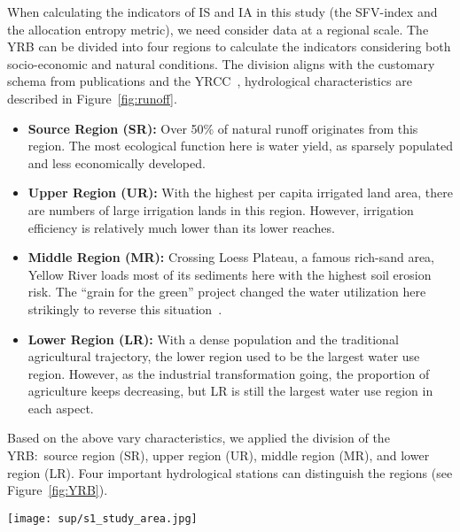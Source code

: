 When calculating the indicators of IS and IA in this study (the SFV-index and the allocation entropy metric), we need consider data at a regional scale.
The YRB can be divided into four regions to calculate the indicators considering both socio-economic and natural conditions.
The division aligns with the customary schema from publications and the YRCC~\cite{yellowriverwaterconservancycommission2010,wang2019c}, hydrological characteristics are described in Figure~\ref{fig:runoff}.

\begin{itemize}
    \item \textbf{Source Region (SR):} Over 50\% of natural runoff originates from this region. The most ecological function here is water yield, as sparsely populated and less economically developed.
    \item \textbf{Upper Region (UR):} With the highest per capita irrigated land area, there are numbers of large irrigation lands in this region. However, irrigation efficiency is relatively much lower than its lower reaches.
    \item \textbf{Middle Region (MR):} Crossing Loess Plateau, a famous rich-sand area, Yellow River loads most of its sediments here with the highest soil erosion risk. The ``grain for the green'' project changed the water utilization here strikingly to reverse this situation~\cite{wu2020a}.
    \item \textbf{Lower Region (LR):} With a dense population and the traditional agricultural trajectory, the lower region used to be the largest water use region. However, as the industrial transformation going, the proportion of agriculture keeps decreasing, but LR is still the largest water use region in each aspect.
\end{itemize}

Based on the above vary characteristics, we applied the division of the YRB:\ source region (SR), upper region (UR), middle region (MR), and lower region (LR).
Four important hydrological stations can distinguish the regions (see Figure~\ref{fig:YRB}).

\begin{figure*}[!hbtp]
    \centering
    \texttt{[image: sup/s1\_study\_area.jpg]}
    \caption{
        The study area.
        \textbf{A.} Diagram of the YRB and the subdivision of the basin (SR:\ Source Region, UR:\ Upper Region, MR:\ Middle Region, DR:\ Downstream region).
        \textbf{B.} Profile of the main channel of the Yellow River. The hydrological stations control the SR, UR, MR and DR.\
        \textbf{C.} Typical landscapes in different regions in the YRB.\
    }\label{fig:YRB}
\end{figure*}


